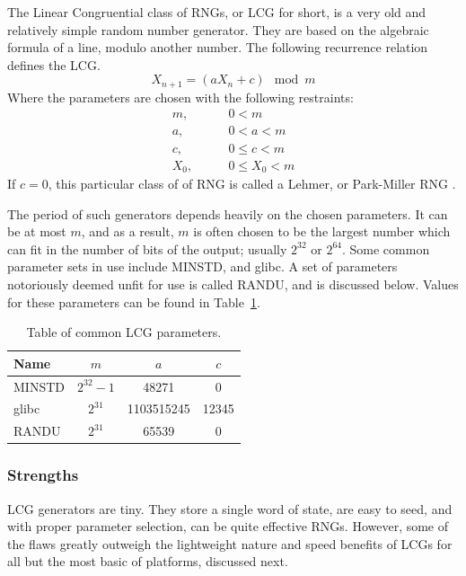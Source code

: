 The Linear Congruential class of RNGs, or LCG for short, is a very old and relatively simple random number generator. They are based on the algebraic formula of a line, modulo another number. The following recurrence relation defines the LCG.
\begin{equation} \label{eq:lcg}
    X_{n+1} = (aX_n + c) \mod m
\end{equation}
Where the parameters are chosen with the following restraints:
\begin{align*}
    m,   \qquad & 0 < m \\
    a,   \qquad & 0 < a < m \\
    c,   \qquad & 0 \leq c < m \\
    X_0, \qquad & 0 \leq X_0 < m
\end{align*}
If $c = 0$, this particular class of of RNG is called a Lehmer, or Park-Miller RNG \cite{Payne:1969:CLP:362848.362860,Park:1988:RNG:63039.63042}.

The period of such generators depends heavily on the chosen parameters. It can be at most $m$, and as a result, $m$ is often chosen to be the largest number which can fit in the number of bits of the output; usually $2^{32}$ or $2^{64}$. Some common parameter sets in use include MINSTD, and glibc. A set of parameters notoriously deemed unfit for use is called RANDU, and is discussed below. Values for these parameters can be found in Table~\ref{tab:lcg_params}.

\begin{table}[tb]
    \caption{Table of common LCG parameters.}
    \label{tab:lcg_params}
    \begin{center}
        \begin{tabular}{l|ccc}
        \hline
        \hline
        \textbf{Name} & $m$ & $a$ & $c$ \\
        \hline
            MINSTD & $2^{32} - 1$ & 48271 & 0 \\
            glibc & $2^{31}$ & 1103515245 & 12345 \\
            RANDU & $2^{31}$ & 65539 & 0 \\
        \hline
        \hline
        \end{tabular}
    \end{center}
\end{table}

\subsubsection{Strengths}
LCG generators are tiny. They store a single word of state, are easy to seed, and with proper parameter selection, can be quite effective RNGs. However, some of the flaws greatly outweigh the lightweight nature and speed benefits of LCGs for all but the most basic of platforms, discussed next.

